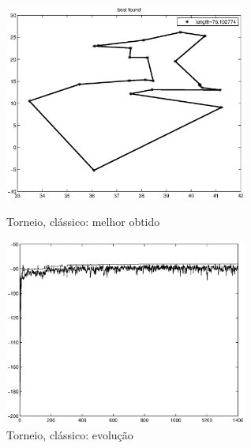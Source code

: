 \documentclass[a4paper]{article}
\begin{document}
\begin{figure}
\begin{minipage}[b]{0.5\linewidth} %
\centering
\includegraphics[width=8cm]{torneio_gencombine_best}
\caption{Torneio, clássico: melhor obtido}
\label{fig:torneio_gencombine_best}
\end{minipage}
\hspace{0.5cm} %
\begin{minipage}[b]{0.5\linewidth}
\centering
\includegraphics[width=8cm]{torneio_gencombine_evol}
\caption{Torneio, clássico: evolução}
\label{fig:torneio_gencombine_evol}
\end{minipage}
\end{figure}
\end{document}
